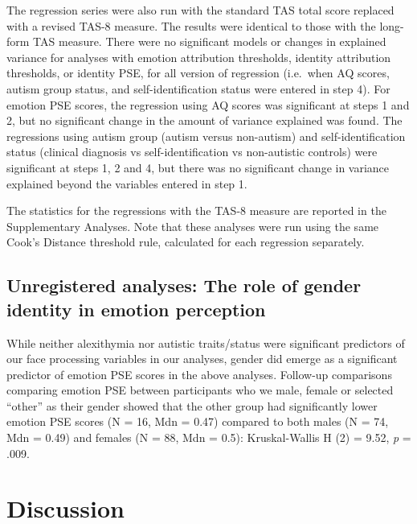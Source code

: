 \documentclass[
]{article}
\begin{document}
The regression series were also run with the standard TAS total score replaced with a revised TAS-8 measure. The results were identical to those with the long-form TAS measure. There were no significant models or changes in explained variance for analyses with emotion attribution thresholds, identity attribution thresholds, or identity PSE, for all version of regression (i.e.~when AQ scores, autism group status, and self-identification status were entered in step 4). For emotion PSE scores, the regression using AQ scores was significant at steps 1 and 2, but no significant change in the amount of variance explained was found. The regressions using autism group (autism versus non-autism) and self-identification status (clinical diagnosis vs self-identification vs non-autistic controls) were significant at steps 1, 2 and 4, but there was no significant change in variance explained beyond the variables entered in step 1.

The statistics for the regressions with the TAS-8 measure are reported in the Supplementary Analyses. Note that these analyses were run using the same Cook's Distance threshold rule, calculated for each regression separately.

\hypertarget{unregistered-analyses-the-role-of-gender-identity-in-emotion-perception}{%
\subsection*{Unregistered analyses: The role of gender identity in emotion perception}\label{unregistered-analyses-the-role-of-gender-identity-in-emotion-perception}}

While neither alexithymia nor autistic traits/status were significant predictors of our face processing variables in our analyses, gender did emerge as a significant predictor of emotion PSE scores in the above analyses. Follow-up comparisons comparing emotion PSE between participants who we male, female or selected ``other'' as their gender showed that the other group had significantly lower emotion PSE scores (N = 16, Mdn = 0.47) compared to both males (N = 74, Mdn = 0.49) and females (N = 88, Mdn = 0.5): Kruskal-Wallis H (2) = 9.52, \emph{p} = .009.

\hypertarget{discussion}{%
\section*{Discussion}\label{discussion}}
\end{document}
